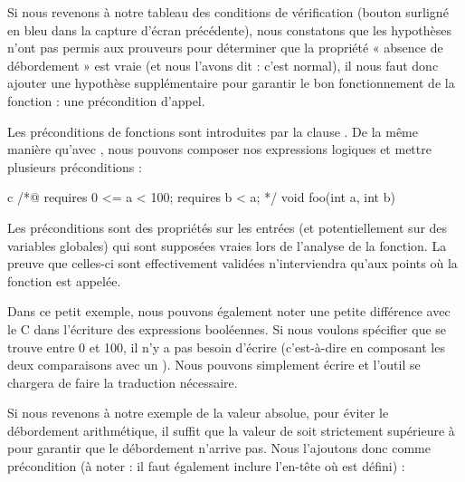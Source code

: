 Si nous revenons à notre tableau des conditions de vérification (bouton
surligné en bleu dans la capture d'écran précédente), nous constatons
que les hypothèses n'ont pas permis aux prouveurs pour déterminer que la
propriété  « absence de débordement » est vraie (et nous l'avons dit : c'est
normal), il nous faut donc ajouter une hypothèse supplémentaire pour garantir
le bon fonctionnement de la fonction : une précondition d'appel.





Les préconditions de fonctions sont introduites par la clause .
De la même manière qu'avec , nous pouvons composer nos
expressions logiques et mettre plusieurs préconditions :



\begin{CodeBlock}{c}
/*@
  requires 0 <= a < 100;
  requires b < a;
*/
void foo(int a, int b){

}
\end{CodeBlock}



Les préconditions sont des propriétés sur les entrées (et potentiellement sur
des variables globales) qui sont supposées vraies lors de
l'analyse de la fonction. La preuve que celles-ci sont effectivement validées
n'interviendra qu'aux points où la fonction est appelée.



Dans ce petit exemple, nous pouvons également noter une petite différence avec
le C dans l'écriture des expressions booléennes. Si nous voulons spécifier
que  se trouve entre 0 et 100, il n'y a pas besoin d'écrire 
(c'est-à-dire en composant les deux comparaisons avec un \CodeInline{\&\&}). Nous
pouvons simplement écrire  et l'outil se chargera de faire
la traduction nécessaire.



Si nous revenons à notre exemple de la valeur absolue, pour éviter le
débordement arithmétique, il suffit que la valeur de  soit
strictement  supérieure à  pour garantir que le
débordement n'arrive pas.
Nous l'ajoutons donc comme précondition (à noter : il faut également
inclure l'en-tête où  est défini) :






